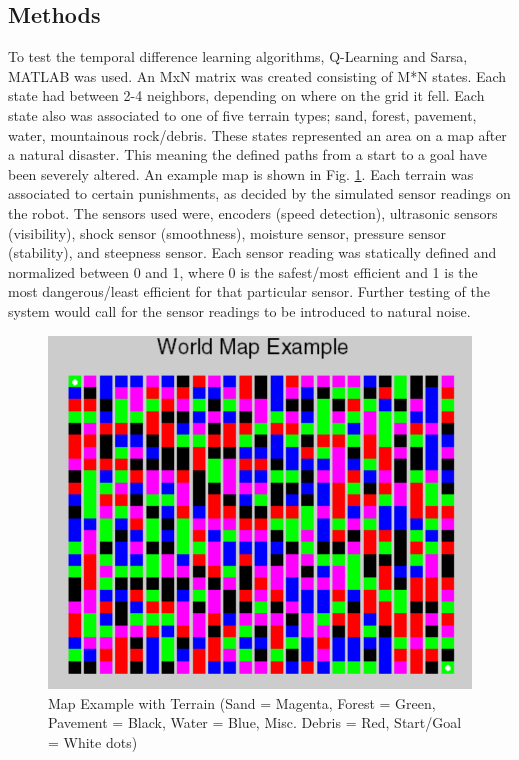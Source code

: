 \documentclass[12pt,american]{report}
\begin{document}
\subsection{Methods}

To test the temporal difference learning algorithms, Q-Learning and Sarsa, MATLAB was used. An MxN matrix was created consisting of M*N states.  Each state had between 2-4 neighbors, depending on where on the grid it fell.  Each state also was associated to one of five terrain types; sand, forest, pavement, water, mountainous rock/debris.  These states represented an area on a map after a natural disaster.  This meaning the defined paths from a start to a goal have been severely altered. An example map is shown in Fig. \ref{fig:map-example}. Each terrain was associated to certain punishments, as decided by the simulated sensor readings on the robot.  The sensors used were, encoders (speed detection), ultrasonic sensors (visibility), shock sensor (smoothness), moisture sensor, pressure sensor (stability), and steepness sensor.  Each sensor reading was statically defined and normalized between 0 and 1, where 0 is the safest/most efficient and 1 is the most dangerous/least efficient for that particular sensor. Further testing of the system would call for the sensor readings to be introduced to natural noise.

\begin{figure}
\centering
\includegraphics[scale=.5]{images/map-example.PNG}
\caption{Map Example with Terrain (Sand = Magenta, Forest = Green, Pavement = Black, Water = Blue, Misc. Debris = Red, Start/Goal = White dots)}
\label{fig:map-example}
\end{figure}
\end{document}
